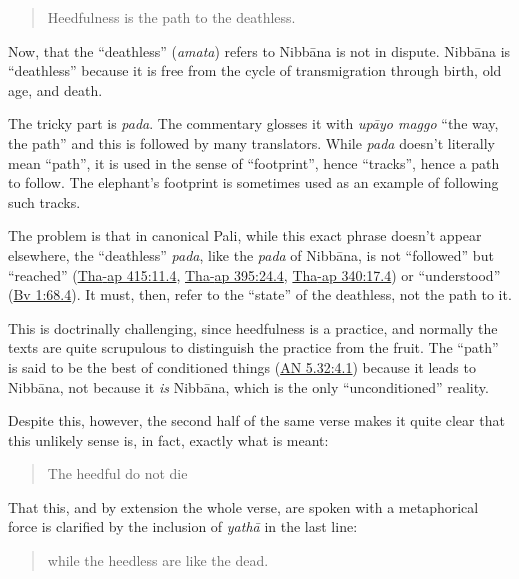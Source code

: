\documentclass[12pt,openany]{book}%
\begin{document}
\begin{verse}%
Heedfulness is the path to the deathless.

%
\end{verse}

Now, that the “deathless” (\textit{amata}) refers to \textsanskrit{Nibbāna} is not in dispute. \textsanskrit{Nibbāna} is “deathless” because it is free from the cycle of transmigration through birth, old age, and death.

The tricky part is \textit{pada}. The commentary glosses it with \textit{\textsanskrit{upāyo} maggo} “the way, the path” and this is followed by many translators. While \textit{pada} doesn’t literally mean “path”, it is used in the sense of “footprint”, hence “tracks”, hence a path to follow. The elephant’s footprint is sometimes used as an example of following such tracks.

The problem is that in canonical Pali, while this exact phrase doesn’t appear elsewhere, the “deathless” \textit{pada}, like the \textit{pada} of \textsanskrit{Nibbāna}, is not “followed” but “reached” (\href{https://suttacentral.net/tha{-}ap415/pli/ms\#11.4}{Tha{-}ap 415:11.4}, \href{https://suttacentral.net/tha{-}ap395/pli/ms\#24.4}{Tha{-}ap 395:24.4}, \href{https://suttacentral.net/tha{-}ap340/pli/ms\#17.4}{Tha{-}ap 340:17.4}) or “understood” (\href{https://suttacentral.net/bv1/pli/ms\#68.4}{Bv 1:68.4}). It must, then, refer to the “state” of the deathless, not the path to it.

This is doctrinally challenging, since heedfulness is a practice, and normally the texts are quite scrupulous to distinguish the practice from the fruit. The “path” is said to be the best of conditioned things (\href{https://suttacentral.net/an5.32/en/sujato\#4.1}{AN 5.32:4.1}) because it leads to \textsanskrit{Nibbāna}, not because it \emph{is} \textsanskrit{Nibbāna}, which is the only “unconditioned” reality.

Despite this, however, the second half of the same verse makes it quite clear that this unlikely sense is, in fact, exactly what is meant:

\begin{verse}%
The heedful do not die

%
\end{verse}

That this, and by extension the whole verse, are spoken with a metaphorical force is clarified by the inclusion of \textit{\textsanskrit{yathā}} in the last line:

\begin{verse}%
while the heedless are like the dead.

%
\end{verse}
\end{document}
